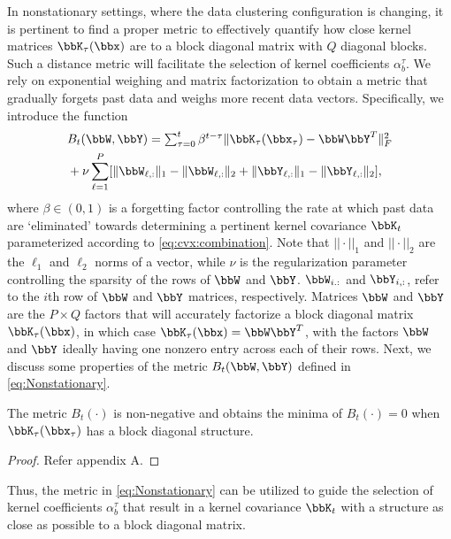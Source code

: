 \documentclass[10pt,final]{IEEEtran}
\begin{document}
In nonstationary settings, where the data clustering configuration is changing, it is pertinent to find a proper metric to effectively quantify how close kernel matrices $\bbK_{\tau}(\bbx)$ are to a block diagonal matrix with $Q$ diagonal blocks. Such a distance metric will facilitate the selection of kernel coefficients $\alpha_b^{\tau}$. We rely on exponential weighing and matrix factorization to  obtain a metric that  gradually forgets past data and weighs more recent data vectors.  Specifically, we introduce the function
\begin{align}\label{eq:Nonstationary}
&B_t(\bbW,\bbY)=\textstyle\sum_{\tau=0}^{t}\beta^{t-\tau}\|\bbK_{\tau}(\bbx_{\tau})-\bbW\bbY^T\|_F^2\\
&+\nu\sum_{\ell=1}^{P}[\|\bbW_{\ell,:}\|_1-\|\bbW_{\ell,:}\|_2
+\|\bbY_{\ell,:}\|_1-\|\bbY_{\ell,:}\|_2],\nonumber
\end{align}
where $\beta\in(0,1)$ is a forgetting factor controlling the rate at which past data are `eliminated' towards determining a pertinent kernel covariance $\bbK_{t}$ parameterized according to \eqref{eq:cvx:combination}. Note that $||\cdot||_1$ and $||\cdot||_2$ are the $\ell_1$ and $\ell_2$ norms of a vector, while $\nu$ is the regularization parameter controlling the sparsity of the rows of $\bbW$ and $\bbY$. $\bbW_{i.:}$ and $\bbY_{i,:}$, refer to the $i$th row of $\bbW$ and $\bbY$ matrices, respectively. Matrices $\bbW$ and $\bbY$  are the $P\times Q$ factors that will accurately factorize a block diagonal matrix $\bbK_{\tau}(\bbx)$, in which case $\bbK_{\tau}(\bbx)=\bbW\bbY^T$, with the factors $\bbW$ and $\bbY$ ideally having one nonzero entry across each of their rows. Next, we discuss some properties of the metric $B_t(\bbW,\bbY)$ defined in \eqref{eq:Nonstationary}.
\begin{lemma}\label{Lemma:Metric}
The metric $B_t(\cdot)$ is non-negative and obtains the minima of $B_t(\cdot)=0$ when $\bbK_{\tau}(\bbx_{\tau})$ has a block diagonal structure.  
\end{lemma}

\begin{proof}
Refer appendix A.
\end{proof}

Thus, the metric in \eqref{eq:Nonstationary} can be utilized to guide the selection of kernel coefficients $\alpha_b^{\tau}$ that result in a kernel covariance $\bbK_{t}$ with a structure as close as possible to a block diagonal matrix.
\end{document}
